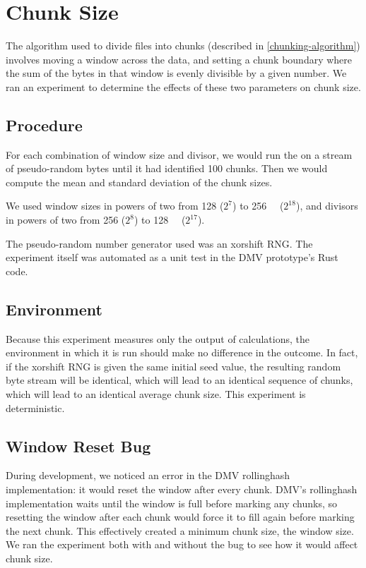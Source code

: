 \section{Chunk Size}\label{rolling-hash-exp}

The algorithm used to divide files into chunks (described in
\autoref{chunking-algorithm}) involves moving a window across the data, and
setting a chunk boundary where the sum of the bytes in that window is evenly
divisible by a given number. We ran an experiment to determine the effects of
these two parameters on chunk size.

\subsection{Procedure}

For each combination of window size and divisor, we would run the
 on a stream of pseudo-random bytes until it had
identified \num{100} chunks. Then we would compute the mean and standard
deviation of the chunk sizes.

We used window sizes in powers of two from \SI{128}{\byte} ($2^7$) to
\SI{256}{\kibi\byte} ($2^{18}$), and divisors in powers of two from \num{256}
($2^8$) to \SI{128}{\kibi\relax} ($2^{17}$).

The pseudo-random number generator used was an xorshift RNG\cite{xorshift_rng}.
The experiment itself was automated as a unit test in the \gls{DMV} prototype's
Rust code.

\subsection{Environment}

Because this experiment measures only the output of calculations, the
environment in which it is run should make no difference in the outcome. In
fact, if the xorshift RNG is given the same initial seed value, the resulting
random byte stream will be identical, which will lead to an identical sequence
of chunks, which will lead to an identical average chunk size. This experiment
is deterministic.

\subsection{Window Reset Bug}

During development, we noticed an error in the DMV \gls{rollinghash}
implementation: it would reset the window after every chunk. DMV's
\gls{rollinghash} implementation waits until the window is full before marking
any chunks, so resetting the window after each chunk would force it to fill
again before marking the next chunk. This effectively created a minimum chunk
size, the window size. We ran the experiment both with and without the bug to
see how it would affect chunk size.

